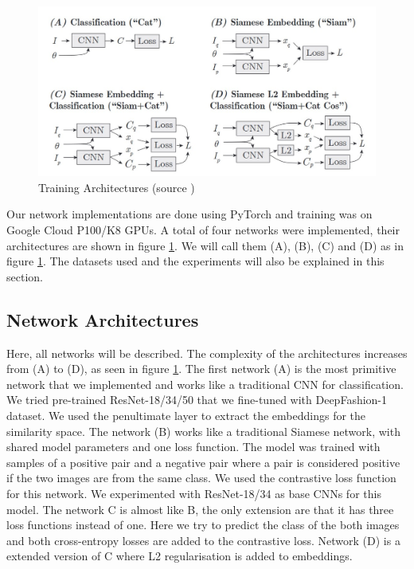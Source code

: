 \documentclass{article}
\begin{document}
\begin{figure}[H]
  \centering
    \includegraphics[width=\linewidth]{network_images.jpg}
    \caption{Training Architectures (source \cite{bell2015learning})}
    \label{fig:netwrok_arch}
\end{figure}

Our network implementations are done using PyTorch and training was on Google Cloud P100/K8 GPUs. A total of four networks were implemented, their architectures are shown in figure \ref{fig:netwrok_arch}. We will call them (A), (B), (C) and (D) as in figure \ref{fig:netwrok_arch}. The datasets used and the experiments will also be explained in this section.

\subsection{Network Architectures}
Here, all networks will be described. The complexity of the architectures increases from (A) to (D), as seen in figure \ref{fig:netwrok_arch}. The first network (A) is the most primitive network that we implemented and works like a traditional CNN for classification. We tried pre-trained ResNet-18/34/50 that we fine-tuned with DeepFashion-1 dataset. We used the penultimate layer to extract the embeddings for the similarity space. The network (B) works like a traditional Siamese network, with shared model parameters and one loss function. The model was trained with samples of a positive pair and a negative pair where a pair is considered positive if the two images are from the same class. We used the contrastive loss function for this network. We experimented with ResNet-18/34 as base CNNs for this model. The network C is almost like B, the only extension are that it has three loss functions instead of one. Here we try to predict the class of the both images and both cross-entropy losses are added to the contrastive loss. Network (D) is a extended version of C where L2 regularisation is added to embeddings.
\end{document}

